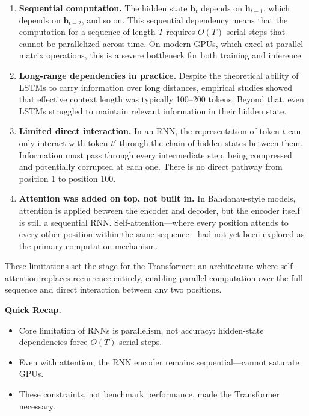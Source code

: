 \begin{enumerate}
    \item \textbf{Sequential computation.} The hidden state $\mathbf{h}_t$ depends on $\mathbf{h}_{t-1}$, which depends on $\mathbf{h}_{t-2}$, and so on. This sequential dependency means that the computation for a sequence of length $T$ requires $O(T)$ serial steps that cannot be parallelized across time. On modern GPUs, which excel at parallel matrix operations, this is a severe bottleneck for both training and inference.

    \item \textbf{Long-range dependencies in practice.} Despite the theoretical ability of LSTMs to carry information over long distances, empirical studies showed that effective context length was typically 100--200 tokens. Beyond that, even LSTMs struggled to maintain relevant information in their hidden state.

    \item \textbf{Limited direct interaction.} In an RNN, the representation of token $t$ can only interact with token $t'$ through the chain of hidden states between them. Information must pass through every intermediate step, being compressed and potentially corrupted at each one. There is no direct pathway from position 1 to position 100.

    \item \textbf{Attention was added on top, not built in.} In Bahdanau-style models, attention is applied between the encoder and decoder, but the encoder itself is still a sequential RNN. Self-attention---where every position attends to every other position within the same sequence---had not yet been explored as the primary computation mechanism.
\end{enumerate}

These limitations set the stage for the Transformer: an architecture where self-attention replaces recurrence entirely, enabling parallel computation over the full sequence and direct interaction between any two positions.

\begin{quickrecap}
\textbf{Quick Recap.}
\begin{itemize}[nosep,leftmargin=1.5em]
  \item Core limitation of RNNs is parallelism, not accuracy: hidden-state dependencies force $O(T)$ serial steps.
  \item Even with attention, the RNN encoder remains sequential---cannot saturate GPUs.
  \item These constraints, not benchmark performance, made the Transformer necessary.
\end{itemize}
\end{quickrecap}

